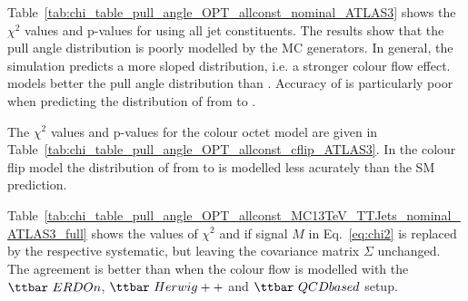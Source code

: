 Table~\ref{tab:chi_table_pull_angle_OPT_allconst_nominal_ATLAS3} shows the $\chi^{2}$ values and p-values for \pullangle using all jet constituents. The results show that the pull angle distribution is poorly modelled by the MC generators. In general, the simulation predicts a more sloped distribution, i.e. a stronger colour flow effect. \HERWIGpp models better the pull angle distribution than . Accuracy of  is particularly poor when predicting the distribution of \pullangle from \scndleadingjet to \leadingjet.

The $\chi^{2}$ values and p-values for the \PW colour octet model are given in Table~\ref{tab:chi_table_pull_angle_OPT_allconst_cflip_ATLAS3}. In the colour flip model the distribution of \pullangle from \leadingjet to \scndleadingjet is modelled less acurately than the SM prediction.
  
Table~\ref{tab:chi_table_pull_angle_OPT_allconst_MC13TeV_TTJets_nominal_ATLAS3_full} shows the values of $\chi^{2}$ and if signal $M$ in Eq.~\ref{eq:chi2} is replaced by the respective systematic, but leaving the covariance matrix $\Sigma$ unchanged. The agreement is better than \ttbar when the colour flow is modelled with the $\ttbar\ ERDOn$, $\ttbar\ Herwig++$ and $\ttbar\ QCDbased$ setup.




















